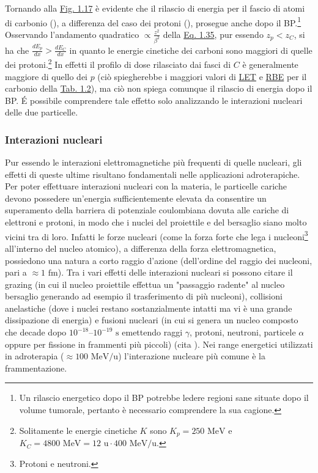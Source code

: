 \documentclass[12pt,a4paper,twoside]{report}
\begin{document}
	Tornando alla \hyperref[fig:photon]{Fig. 1.17} è evidente che il rilascio di energia per il fascio di atomi di carbonio (), a differenza del caso dei protoni (), prosegue anche dopo il BP.\footnote{Un rilascio energetico dopo il BP potrebbe ledere regioni sane situate dopo il volume tumorale, pertanto è necessario comprendere la sua cagione.} Osservando l'andamento quadratico $\propto\frac{z^2}{\beta^2}$ della \hyperref[eq:bethe_bloch]{Eq. 1.35}, pur essendo $z_p<z_C$, si ha che $\frac{dE_p}{dx}>\frac{dE_C}{dx}$ in quanto le energie cinetiche dei carboni sono maggiori di quelle dei protoni.\footnote{Solitamente le energie cinetiche $K$ sono $K_p=250 \mbox{ MeV}$ e $K_C=4800\mbox{ MeV}=12\mbox{ u}\cdot400\mbox{ MeV/u}$.} In effetti il profilo di dose rilasciato dai fasci di $C$ è generalmente maggiore di quello dei $p$ (ciò spiegherebbe i maggiori valori di \hyperref[par:let]{LET} e \hyperref[par:rbe]{RBE} per il carbonio della \hyperref[tab:let_rbe]{Tab. 1.2}), ma ciò non spiega comunque il rilascio di energia dopo il BP. \'E possibile comprendere tale effetto solo analizzando le interazioni nucleari delle due particelle.
	
	\subsubsection{Interazioni nucleari}
	Pur essendo le interazioni elettromagnetiche più frequenti di quelle nucleari, gli effetti di queste ultime risultano fondamentali nelle applicazioni adroterapiche. Per poter effettuare interazioni nucleari con la materia, le particelle cariche devono possedere un'energia sufficientemente elevata da consentire un superamento della barriera di potenziale coulombiana dovuta alle cariche di elettroni e protoni, in modo che i nuclei del proiettile e del bersaglio siano molto vicini tra di loro. Infatti le forze nucleari (come la forza forte che lega i nucleoni\footnote{Protoni e neutroni.} all'interno del nucleo atomico), a differenza della forza elettromagnetica, possiedono una natura a corto raggio d'azione (dell'ordine del raggio dei nucleoni, pari a $\approx1\mbox{ fm}$). Tra i vari effetti delle interazioni nucleari si possono citare il grazing (in cui il nucleo proiettile effettua un "passaggio radente" al nucleo bersaglio generando ad esempio il trasferimento di più nucleoni), collisioni anelastiche (dove i nuclei restano sostanzialmente intatti ma vi è una grande dissipazione di energia) e fusioni nucleari (in cui si genera un nucleo composto che decade dopo $10^{-18}$--$10^{-19}\mbox{ s}$ emettendo raggi $\gamma$, protoni, neutroni, particele $\alpha$ oppure per fissione in frammenti più piccoli) (cita
	). Nei range energetici utilizzati in adroterapia ($\approx100\mbox{ MeV/u}$) l'interazione nucleare più comune è la frammentazione.
	
\end{document}
